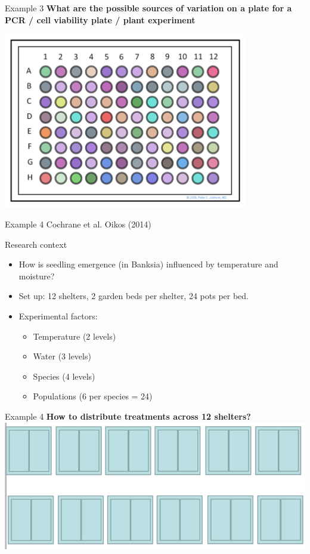 \documentclass[10pt]{beamer}
\begin{document}
\begin{frame}{Example 3}
 \textbf{What are the possible sources of variation on a plate for a PCR / cell viability plate / plant experiment}
 
 \centering
 \includegraphics[width=0.8\textwidth]{Figures/expdesc}
\end{frame}

\begin{frame}{Example 4}
Cochrane et al. Oikos (2014)
\begin{block}{Research context}
\begin{itemize}
  \item How is seedling emergence (in Banksia) influenced by temperature and moisture?
  \item Set up: 12 shelters, 2 garden beds per shelter, 24 pots per bed.
  \item Experimental factors: 
    \begin{itemize}
      \item Temperature (2 levels)
      \item Water (3 levels)
      \item Species (4 levels) 
      \item Populations (6 per species = 24)
     \end{itemize}
\end{itemize}
\end{block}

\end{frame}

\begin{frame}{Example 4}
\textbf{How to distribute treatments across 12 shelters?}
  \centering
  \includegraphics[width=\textwidth]{Figures/shelters}
\end{frame}
\end{document}
